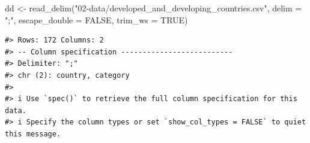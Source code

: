 \documentclass[
  11pt,
  a4paper,
  twoside]{scrbook}
\newenvironment{Shaded}{\begin{snugshade}}{\end{snugshade}}
\newcommand{\AttributeTok}[1]{\textcolor[rgb]{0.77,0.63,0.00}{#1}}
\newcommand{\ConstantTok}[1]{\textcolor[rgb]{0.00,0.00,0.00}{#1}}
\newcommand{\DecValTok}[1]{\textcolor[rgb]{0.00,0.00,0.81}{#1}}
\newcommand{\FloatTok}[1]{\textcolor[rgb]{0.00,0.00,0.81}{#1}}
\newcommand{\FunctionTok}[1]{\textcolor[rgb]{0.00,0.00,0.00}{#1}}
\newcommand{\NormalTok}[1]{#1}
\newcommand{\OtherTok}[1]{\textcolor[rgb]{0.56,0.35,0.01}{#1}}
\newcommand{\SpecialCharTok}[1]{\textcolor[rgb]{0.00,0.00,0.00}{#1}}
\newcommand{\StringTok}[1]{\textcolor[rgb]{0.31,0.60,0.02}{#1}}
\begin{document}
\linespread{1}

\begin{Shaded}
\begin{Highlighting}[]

\NormalTok{dd }\OtherTok{\textless{}{-}} \FunctionTok{read\_delim}\NormalTok{(}\StringTok{"02{-}data/developed\_and\_developing\_countries.csv"}\NormalTok{, }
                                  \AttributeTok{delim =} \StringTok{";"}\NormalTok{, }\AttributeTok{escape\_double =} \ConstantTok{FALSE}\NormalTok{,}
                                  \AttributeTok{trim\_ws =} \ConstantTok{TRUE}\NormalTok{)}
\end{Highlighting}
\end{Shaded}

\linespread{1}

\begin{verbatim}
#> Rows: 172 Columns: 2
#> -- Column specification --------------------------
#> Delimiter: ";"
#> chr (2): country, category
#> 
#> i Use `spec()` to retrieve the full column specification for this data.
#> i Specify the column types or set `show_col_types = FALSE` to quiet this message.
\end{verbatim}

\linespread{1}

\begin{Shaded}
\end{Shaded}
\end{document}
